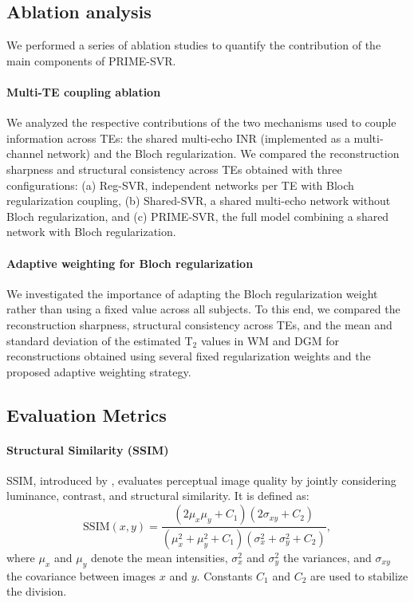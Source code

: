 \documentclass[preprint,authoryear,12pt]{elsarticle}
\begin{document}
\subsection{Ablation analysis} We performed a series of ablation studies to quantify the contribution of the main components of PRIME-SVR. 

\paragraph{Multi-TE coupling ablation}
We analyzed the respective contributions of the two mechanisms used to couple information across TEs: the shared multi-echo INR (implemented as a multi-channel network) and the Bloch regularization. We compared the reconstruction sharpness and structural consistency across TEs obtained with three configurations: (a) Reg-SVR, independent networks per TE with Bloch regularization coupling, (b) Shared-SVR, a shared multi-echo network without Bloch regularization, and (c) PRIME-SVR, the full model combining a shared network with Bloch regularization.

\paragraph{Adaptive weighting for Bloch regularization}
We investigated the importance of adapting the Bloch regularization weight rather than using a fixed value across all subjects. To this end, we compared the reconstruction sharpness,  structural consistency across TEs, and the mean and standard deviation of the estimated T$_2$ values in WM and DGM for reconstructions obtained using several fixed regularization weights and the proposed adaptive weighting strategy.



\subsection{Evaluation Metrics}

\paragraph{Structural Similarity (SSIM)}
SSIM, introduced by \cite{wang2004image}, evaluates perceptual image quality by jointly considering luminance, contrast, and structural similarity. It is defined as:
\begin{equation*}
\mathrm{SSIM}(x,y) = \frac{(2\mu_x \mu_y + C_1)(2\sigma_{xy} + C_2)}{(\mu_x^2 + \mu_y^2 + C_1)(\sigma_x^2 + \sigma_y^2 + C_2)},
\end{equation*}
where $\mu_x$ and $\mu_y$ denote the mean intensities, $\sigma_x^2$ and $\sigma_y^2$ the variances, and $\sigma_{xy}$ the covariance between images $x$ and $y$. Constants $C_1$ and $C_2$ are used to stabilize the division. %
    
\end{document}
